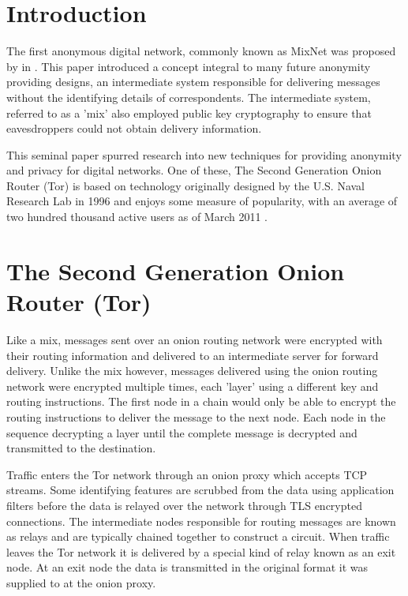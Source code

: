 \documentclass[conference]{IEEEtran}
\begin{document}
\section{Introduction}

The first anonymous digital network, commonly known as MixNet was proposed by
\citeauthor{Chaum:1981p296} in 
\parencite{Chaum:1981p296}. This paper introduced a concept integral to many
future anonymity providing designs, an intermediate system responsible for
delivering messages without the identifying details of correspondents. The
intermediate system, referred to as a 'mix' also employed public key
cryptography to ensure that eavesdroppers could not obtain delivery information.

This seminal paper spurred research into new techniques for providing anonymity
and privacy for digital networks. One of these, The Second Generation Onion
Router (Tor) is based on technology originally designed by the U.S. Naval
Research Lab in 1996 \parencite{Goldschlag:1996wy} and enjoys some measure of
popularity, with an average of two hundred thousand active users as of March
2011 \parencite{The-Tor-Project-Inc.:2011fk}.

\section{The Second Generation Onion Router (Tor)}

Like a mix, messages sent over an onion routing network were encrypted with
their routing information and delivered to an intermediate server for forward
delivery.  Unlike the mix however, messages delivered using the onion routing
network were encrypted multiple times, each 'layer' using a different key and
routing instructions. The first node in a chain would only be able to encrypt
the routing instructions to deliver the message to the next node. Each node in
the sequence decrypting a layer until the complete message is decrypted and
transmitted to the destination.

Traffic enters the Tor network through an onion proxy which accepts TCP streams.
Some identifying features are scrubbed from the data using application filters
before the data is relayed over the network through TLS \parencite{website:TLS}
encrypted connections. The intermediate nodes responsible for routing messages
are known as relays and are typically chained together to construct a circuit.
When traffic leaves the Tor network it is delivered by a special kind of relay
known as an exit node. At an exit node the data is transmitted in the original
format it was supplied to at the onion proxy.
\end{document}
